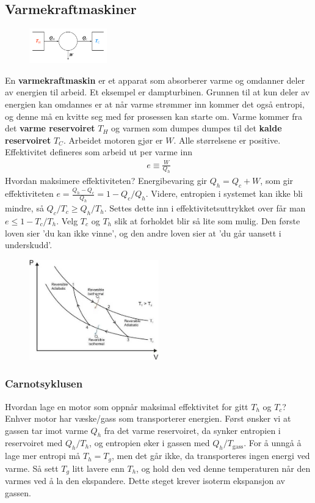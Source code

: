 \documentclass[12pt]{article}
\begin{document}
\subsection{Varmekraftmaskiner}
\begin{figure}
  \includegraphics[width=0.3\textwidth]{figures/carnot.png}
\end{figure}
En \textbf{varmekraftmaskin} er et apparat som absorberer varme og omdanner
deler av energien til arbeid. Et eksempel er dampturbinen. Grunnen til at kun
deler av energien kan omdannes er at når varme strømmer inn kommer det også
entropi, og denne må en kvitte seg med før prosessen kan starte om.
Varme kommer fra det \textbf{varme reservoiret} $T_H$ og varmen som dumpes dumpes til
det \textbf{kalde reservoiret} $T_C$. Arbeidet motoren gjør er $W$. Alle størrelsene er positive.
Effektivitet defineres som arbeid ut per varme inn
\begin{align*}
  e \equiv \frac{W}{Q_h}
\end{align*}
Hvordan maksimere effektiviteten? Energibevaring gir $Q_h = Q_c + W$, som gir
effektiviteten $e = \frac{Q_h - Q_c}{Q_h} = 1 - Q_c/Q_h$.
Videre, entropien i systemet kan ikke bli mindre, så $Q_c / T_c \geq Q_h / T_h$.
Settes dette inn i effektivitetsuttrykket over får man $e \leq 1 - T_c / T_h$.
Velg $T_c$ og $T_h$ slik at forholdet blir så lite som mulig. Den første loven
sier 'du kan ikke vinne', og den andre loven sier at 'du går uansett i underskudd'.
\begin{figure}
  \includegraphics[width=0.5\textwidth]{figures/carnotPV.jpg}
\end{figure}
\subsubsection{Carnotsyklusen}
Hvordan lage en motor som oppnår maksimal effektivitet for gitt $T_h$ og $T_c$?
Enhver motor har væske/gass som transporterer energien. Først ønsker vi at
gassen tar imot varme $Q_h$ fra det varme reservoiret, da synker entropien i
reservoiret med $Q_h/T_h$, og entropien øker i gassen med $Q_h / T_\text{gass}$.
For å unngå å lage mer entropi må $T_h = T_g$, men det går ikke, da transporteres
ingen energi ved varme. Så sett $T_g$ litt lavere enn $T_h$, og hold den ved
denne temperaturen når den varmes ved å la den ekspandere. Dette steget krever
isoterm ekspansjon av gassen.
\end{document}
